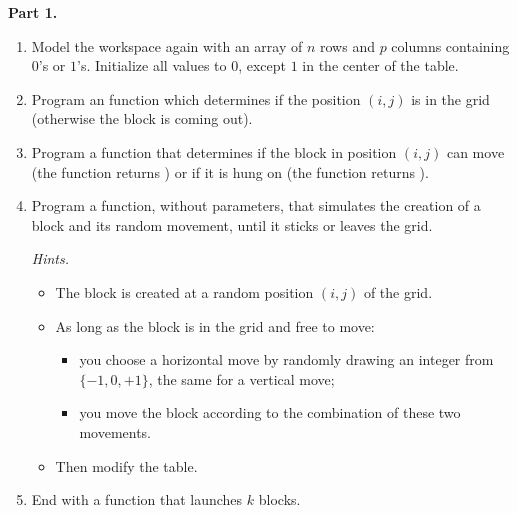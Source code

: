 \documentclass[11pt,class=report,crop=false]{standalone}
\begin{document}

\begin{activite}


\textbf{Part 1.}

\begin{enumerate}
  \item Model the workspace again with an array of $n$ rows and $p$ columns containing $0$'s or $1$'s. Initialize all values to $0$, except $1$ in the center of the table.
  
  \item Program an  function which determines if the position $(i,j)$ is in the grid (otherwise the block is coming out).
    
  \item Program a  function that determines if the block in position $(i,j)$ can move (the function returns ) or if it is hung on (the function returns ).

  \item Program a  function, without parameters, that simulates the creation of a block and its random movement, until it sticks or leaves the grid.
  
  \emph{Hints.}
  \begin{itemize}
    \item The block is created at a random position $(i,j)$ of the grid.
    \item As long as the block is in the grid and free to move:
    \begin{itemize}
      \item you choose a horizontal move by randomly drawing an integer from $\{-1,0,+1\}$, the same for a vertical move;
      \item you move the block according to the combination of these two movements.
    \end{itemize}  
    \item Then modify the table.      
  \end{itemize}

  
    \item End with a  function that launches $k$ blocks.   
\end{enumerate}



\end{activite}
\end{document}
